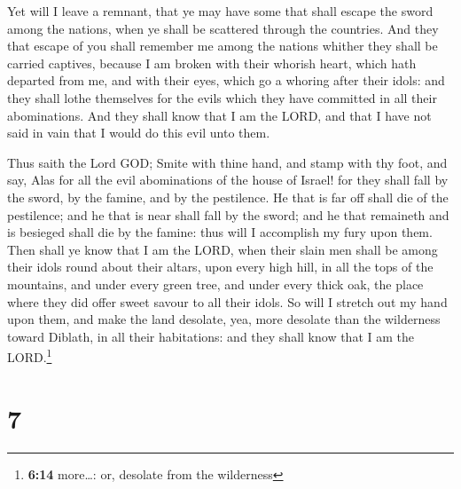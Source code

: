  Yet will I leave a remnant, that ye may have some that
shall escape the sword among the nations, when ye shall be scattered
through the countries.  And they that escape of you shall
remember me among the nations whither they shall be carried captives,
because I am broken with their whorish heart, which hath departed from
me, and with their eyes, which go a whoring after their idols: and they
shall lothe themselves for the evils which they have committed in all
their abominations.  And they shall know that I am the
LORD, and that I have not said in vain that I would do this evil unto
them.

 Thus saith the Lord GOD; Smite with thine hand, and
stamp with thy foot, and say, Alas for all the evil abominations of the
house of Israel! for they shall fall by the sword, by the famine, and by
the pestilence.  He that is far off shall die of the
pestilence; and he that is near shall fall by the sword; and he that
remaineth and is besieged shall die by the famine: thus will I
accomplish my fury upon them.  Then shall ye know that I
am the LORD, when their slain men shall be among their idols round about
their altars, upon every high hill, in all the tops of the mountains,
and under every green tree, and under every thick oak, the place where
they did offer sweet savour to all their idols.  So will
I stretch out my hand upon them, and make the land desolate, yea, more
desolate than the wilderness toward Diblath, in all their habitations:
and they shall know that I am the LORD.\footnote{\textbf{6:14}
  more\ldots: or, desolate from the wilderness}

\hypertarget{section-6}{%
\section{7}\label{section-6}}

